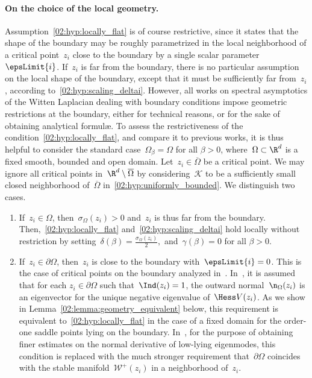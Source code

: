     \paragraph{On the choice of the local geometry.}
    Assumption~\eqref{02:hyp:locally_flat} is of course restrictive, since it states that the shape of the boundary may be roughly parametrized in the local neighborhood of a critical point~$z_i$ close to the boundary by a single scalar parameter~$\epsLimit{i}$. If~$z_i$ is far from the boundary, there is no particular assumption on the local shape of the boundary, except that it must be sufficiently far from~$z_i$, according to~\eqref{02:hyp:scaling_deltai}.
    However, all works on spectral asymptotics of the Witten Laplacian dealing with boundary conditions impose geometric restrictions at the boundary, either for technical reasons, or for the sake of obtaining analytical formul\ae.
    To assess the restrictiveness of the condition~\eqref{02:hyp:locally_flat}, and compare it to previous works, it is thus helpful to consider the standard case~$\Omega_\beta = \Omega$ for all $\beta>0$, where~$\Omega\subset\R^d$ is a fixed smooth, bounded and open domain.
    Let~$z_i\in\overline\Omega$ be a critical point. We may ignore all critical points in~$\R^d\setminus \overline\Omega$ by considering~$\mathcal K$ to be a sufficiently small closed neighborhood of~$\overline\Omega$ in~\eqref{02:hyp:uniformly_bounded}.
    We distinguish two cases.
    \begin{enumerate}
        \item{If~$z_i\in\Omega$, then~$\sigma_\Omega(z_i)>0$ and~$z_i$ is thus far from the boundary. Then,~\eqref{02:hyp:locally_flat} and~\eqref{02:hyp:scaling_deltai} hold locally without restriction by setting~$\delta(\beta) = \frac{\sigma_\Omega(z_i)}2,$ and~$\gamma(\beta)=0$ for all $\beta>0$.}
        \item{If~$z_i\in\partial\Omega$, then~$z_i$ is close to the boundary with~$\epsLimit{i}=0$. This is the case of critical points on the boundary analyzed in~\cite{LPN21,LLPN22}. In~\cite{LPN21}, it is assumed that for each $z_i\in\partial \Omega$ such that~$\Ind(z_i)=1$, the outward normal~$\n_{\Omega}(z_i)$ is an eigenvector for the unique negative eigenvalue of~$\Hess V(z_i)$. As we show in Lemma~\ref{02:lemma:geometry_equivalent} below, this requirement is equivalent to~\eqref{02:hyp:locally_flat} in the case of a fixed domain for the order-one saddle points lying on the boundary. In~\cite{LLPN22}, for the purpose of obtaining finer estimates on the normal derivative of low-lying eigenmodes, this condition is replaced with the much stronger requirement that~$\partial \Omega$ coincides with the stable manifold~$\mathcal{W}^+(z_i)$ in a neighborhood of~$z_i$.}
    \end{enumerate}

